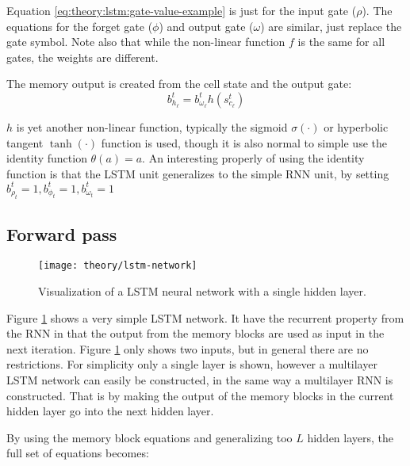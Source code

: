 Equation \eqref{eq:theory:lstm:gate-value-example} is just for the input gate ($\rho$). The equations for the forget gate ($\phi$) and output gate ($\omega$) are similar, just replace the gate symbol. Note also that while the non-linear function $f$ is the same for all gates, the weights are different.

The memory output is created from the cell state and the output gate:
\begin{equation}
b_{h_\ell}^t = b_{\omega_\ell}^t h(s_{c_\ell}^t)
\end{equation}

$h$ is yet another non-linear function, typically the sigmoid $\sigma(\cdot)$ or hyperbolic tangent $\tanh(\cdot)$ function is used, though it is also normal to simple use the identity function $\theta(a) = a$. An interesting properly of using the identity function is that the LSTM unit generalizes to the simple RNN unit, by setting $b_{\rho_t}^t = 1, b_{\phi_t}^t = 1, b_{\omega_t}^t = 1$

\newpage
\subsection{Forward pass}

\begin{figure}[h]
	\centering
	\centerline{\texttt{[image: theory/lstm-network]}}
	\caption{Visualization of a LSTM neural network with a single hidden layer.}
	\label{fig:theory:lstm:lstm-network}
\end{figure}

Figure \ref{fig:theory:lstm:lstm-network} shows a very simple LSTM network. It have the recurrent property from the RNN in that the output from the memory blocks are used as input in the next iteration. Figure \ref{fig:theory:lstm:lstm-network} only shows two inputs, but in general there are no restrictions. For simplicity only a single layer is shown, however a multilayer LSTM network can easily be constructed, in the same way a multilayer RNN is constructed. That is by making the output of the memory blocks in the current hidden layer go into the next hidden layer. 

By using the memory block equations and generalizing too $L$ hidden layers, the full set of equations becomes:

